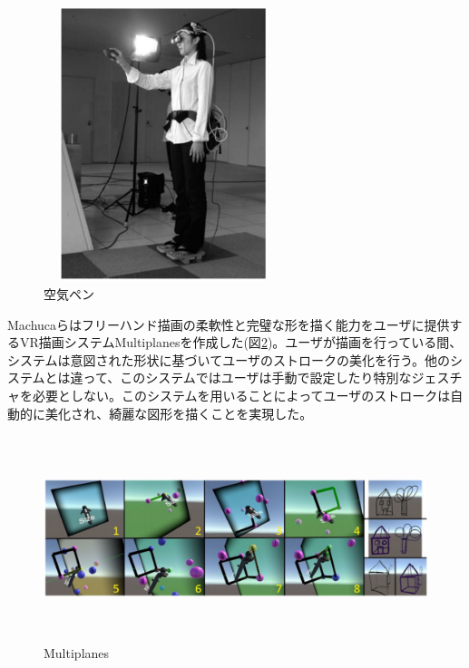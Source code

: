 \documentclass[11pt,a4j, titlepage]{jarticle} %
\begin{document}
\begin{figure}[H]
  \begin{center}
    \includegraphics[clip,height=8.0cm,width=7.0cm]{./kuukipen.eps}
    \caption{空気ペン}
    \label{fig:kuukipen}
  \end{center}
\end{figure}

Machucaら\cite{machuca}はフリーハンド描画の柔軟性と完璧な形を描く能力をユーザに提供するVR描画システムMultiplanesを作成した(図\ref{fig:multiplanes})。ユーザが描画を行っている間、システムは意図された形状に基づいてユーザのストロークの美化を行う。他のシステムとは違って、このシステムではユーザは手動で設定したり特別なジェスチャを必要としない。このシステムを用いることによってユーザのストロークは自動的に美化され、綺麗な図形を描くことを実現した。

\begin{figure}[H]
  \begin{center}
    \includegraphics[clip,height=6.0cm,width=15.0cm]{./multiplanes.eps}
    \caption{Multiplanes}
    \label{fig:multiplanes}
  \end{center}
\end{figure}
\end{document}
